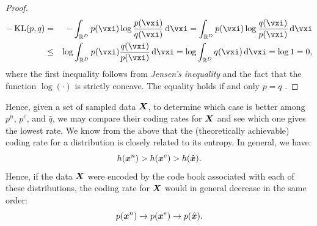 \documentclass[../../book-main.tex]{subfiles}
\begin{document}
\begin{proof}
	\begin{eqnarray*}
		- \KL(p, q)
		&=& - \int_{\R^{D}} p(\vxi) \log \frac{p(\vxi)}{q(\vxi)} \odif{\vxi}
		=  \int_{\R^{D}} p(\vxi) \log \frac{q(\vxi)}{p(\vxi)} \odif{\vxi} \\
		&\le& \log \int_{\R^{D}} p(\vxi)  \frac{q(\vxi)}{p(\vxi)} \odif{\vxi} \label{eqn:jensen-KL}
		= \log \int_{\R^{D}} q(\vxi) \odif{\vxi} = \log 1 = 0,
	\end{eqnarray*}
	where the first inequality follows from {\em Jensen's inequality} and the fact that the function $\log(\cdot)$ is strictly concave. The equality holds if and only $p = q$ .
\end{proof}

Hence, given a set of sampled data $\bm{X}$, to determine which case is better among $p^{n}$, $p^{e}$,  and $\hat{q}$, we may compare their coding rates for $\bm{X}$ and see which one gives the lowest rate. We know from the above that the (theoretically achievable) coding rate for a distribution is closely related to its entropy. In general, we have:
\begin{equation}
	h(\bm{x}^n) > h(\bm{x}^e) > h(\hat {\bm{x}}).
\end{equation}
Hence, if the data $\bm{X}$ were encoded by the code book associated with each of these distributions, the coding rate for $\bm{X}$ would in general decrease in the same order:
\begin{equation}
	p(\bm{x}^n) \rightarrow p(\bm{x}^e) \rightarrow p(\hat {\bm{x}}).
\end{equation}
\end{document}
